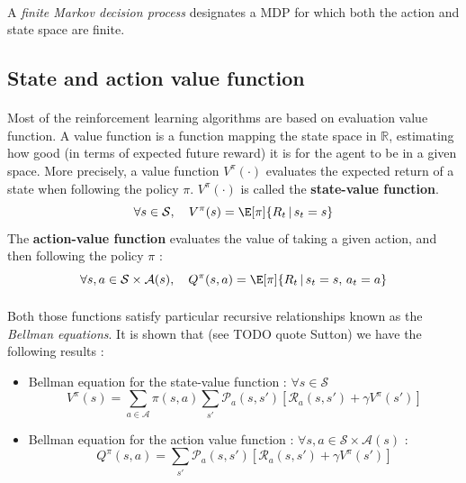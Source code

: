 \documentclass[a4paper]{report}
\begin{document}
{{{				\paragraph{} A \emph{finite Markov decision process} designates a MDP for which both the action and state space are finite. 
			}
			\subsection{State and action value function}
			{
				\paragraph{} Most of the reinforcement learning algorithms are based on evaluation value function. A value function is a function mapping the state space in $\mathbb{R}$, estimating how good (in terms of expected future reward) it is for the agent to be in a given space. More precisely, a value function $V^\pi(\cdot)$ evaluates the expected return of a state when following the policy $\pi$. $V^\pi(\cdot)$ is called the \textbf{state-value function}. 
				\begin{equation}
					\forall{s}\in\mathcal{S}, \quad V^\pi(s) = \E[\pi]{R_t \, \vert \, s_t = s}
				\end{equation}
				The \textbf{action-value function} evaluates the value of taking a given action, and then following the policy $\pi$ : 
				\begin{equation}
					\forall{s,a}\in\mathcal{S}\times\mathcal{A}(s), \quad Q^\pi(s,a) = \E[\pi]{ R_t \, \vert \, s_t=s, \, a_t=a}
				\end{equation}
				
				\paragraph{} Both those functions satisfy particular recursive relationships known as the \emph{Bellman equations}. It is shown that (see TODO quote Sutton) we have the following results : 
				\vspace{10pt}
				
				{
					\begin{itemize}[label=$\triangleright$]
						\item Bellman equation for the state-value function : $\forall s \in\mathcal{S}$ 
						\begin{equation}
							V^\pi(s) = \sum_{a\in\mathcal{A}}\pi(s,a)\sum_{s'} \mathcal{P}_a(s,s')\left[\mathcal{R}_a(s,s') + \gamma V^\pi(s')\right]
						\end{equation}
						\item Bellman equation for the action value function : $\forall{s,a}\in\mathcal{S}\times\mathcal{A}(s)$ : 
						\begin{equation}
							Q^\pi(s,a) = \sum_{s'}\mathcal{P}_a(s,s')\left[ \mathcal{R}_a(s,s') + \gamma V^\pi(s')\right]
						\end{equation}
					\end{itemize}
				}
			}
}}
\end{document}
